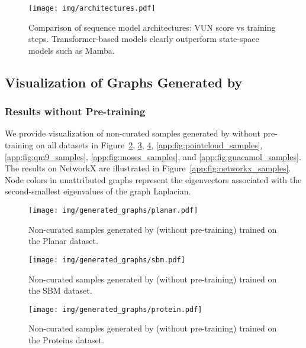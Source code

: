 \begin{figure}[ht]
    \centering
    \texttt{[image: img/architectures.pdf]}
    \caption{Comparison of sequence model architectures: VUN score vs training steps. Transformer-based models clearly outperform state-space models such as Mamba.}
    \label{app:fig:sequence_model}
\end{figure}






\subsection{Visualization of Graphs Generated by \method{}}

\subsubsection{Results without Pre-training}
We provide visualization of non-curated samples generated by \method{} without pre-training on all datasets in Figure~\ref{app:fig:planar_samples}, \ref{app:fig:sbm_samples}, \ref{app:fig:protein_samples}, \ref{app:fig:pointcloud_samples}, \ref{app:fig:qm9_samples}, \ref{app:fig:moses_samples}, and \ref{app:fig:guacamol_samples}. The results on NetworkX are illustrated in Figure~\ref{app:fig:networkx_samples}. Node colors in unattributed graphs represent the eigenvectors associated with the second-smallest eigenvalues of the graph Laplacian.


\begin{figure}[ht]
    \centering
    \texttt{[image: img/generated\_graphs/planar.pdf]}
    \caption{Non-curated samples generated by \method{} (without pre-training) trained on the Planar dataset.}
    \label{app:fig:planar_samples}
\end{figure}

\begin{figure}[ht]
    \centering
    \texttt{[image: img/generated\_graphs/sbm.pdf]}
    \caption{Non-curated samples generated by \method{} (without pre-training) trained on the SBM dataset.}
    \label{app:fig:sbm_samples}
\end{figure}

\begin{figure}[ht]
    \centering
    \texttt{[image: img/generated\_graphs/protein.pdf]}
    \caption{Non-curated samples generated by \method{} (without pre-training) trained on the Proteins dataset.}
    \label{app:fig:protein_samples}
\end{figure}


